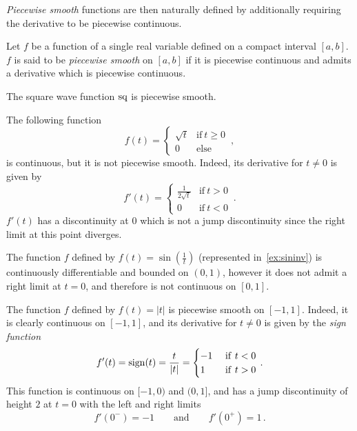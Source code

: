 \emph{Piecewise smooth} functions are then naturally defined by additionally requiring the
derivative to be piecewise continuous.
\begin{definition}
  \label{def:pw-smooth}
  Let $f$ be a function of a single real variable defined on a compact interval $[a,b]$.
  $f$ is said to be \emph{piecewise smooth} on $[a,b]$ if it is piecewise continuous and
  admits a derivative which is piecewise continuous.
\end{definition}
\begin{example}
  The square wave function $\operatorname{sq}$ is piecewise smooth.
\end{example}
\begin{example}
  The following function
  \begin{equation}
    f(t)=
    \begin{cases}
      \sqrt{t} & \text{if}~t\geq 0\\
      0 & \text{else}
    \end{cases}\,,
  \end{equation}
  is continuous, but it is not piecewise smooth. Indeed, its derivative for $t\neq 0$ is
  given by
  \begin{equation}
    f'(t)=
    \begin{cases}
      \frac{1}{2\sqrt{t}} & \text{if}~t>0\\
      0 & \text{if}~t<0
    \end{cases}\,.
  \end{equation}
  $f'(t)$ has a discontinuity at $0$ which is not a jump discontinuity since the right
  limit at this point diverges.
\end{example}
\begin{example}
  \label{ex:sininv}
  The function $f$ defined by $f(t)=\sin(\frac{1}{t})$ (represented in~\cref{ex:sininv})
  is continuously differentiable and bounded on $(0,1)$, however it does not admit a right
  limit at $t=0$, and therefore is not continuous on $[0,1]$.
\end{example}
\begin{example}
  The function $f$ defined by $f(t)=|t|$ is piecewise smooth on $[-1,1]$. Indeed, it is
  clearly continuous on $[-1,1]$, and its derivative for $t\neq 0$ is given by the
  \emph{sign function}
  \begin{equation}
    f'(t)=\operatorname{sign}(t)=\frac{t}{|t|}=
    \begin{cases}
      -1&~\mathrm{if}~t<0\\
      1&~\mathrm{if}~t>0
    \end{cases}\,.
  \end{equation}
  This function is continuous on $[-1,0)$ and $(0,1]$, and has a jump discontinuity of
  height $2$ at $t=0$ with the left and right limits
  \begin{equation}
    f'(0^-)=-1\qquad\text{and}\qquad f'(0^+)=1\,.
  \end{equation}
\end{example}
